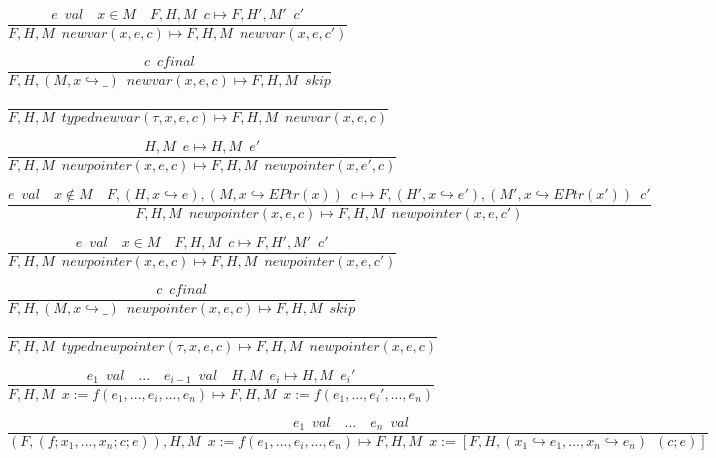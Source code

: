 \documentclass{article}
\begin{document}
\centerline{$\dfrac{e \enspace val \quad x \in M \quad F, H, M  \enspace c \longmapsto F, H', M' \enspace c'}{F, H, M \enspace newvar(x, e, c) \longmapsto F, H, M \enspace newvar(x, e, c')  }$}\vspace{5pt}

\centerline{$\dfrac{c \enspace cfinal}{F, H, (M, x \hookrightarrow \_) \enspace newvar(x, e, c) \longmapsto F, H, M \enspace skip  }$}\vspace{5pt}

\centerline{$\dfrac{}{F, H, M \enspace typednewvar(\tau,x, e, c) \longmapsto F, H, M \enspace newvar(x, e, c)  }$}\vspace{5pt}

\centerline{$\dfrac{H, M \enspace e \longmapsto H, M \enspace e'}{F, H, M \enspace newpointer(x, e, c) \longmapsto F, H, M \enspace newpointer(x, e', c)  }$}\vspace{5pt}

\centerline{$\dfrac{e \enspace val \quad x \notin M \quad F, (H, x \hookrightarrow e), (M, x \hookrightarrow EPtr(x))  \enspace c \longmapsto F, (H', x \hookrightarrow e'), (M', x \hookrightarrow EPtr(x')) \enspace c'}{F, H, M \enspace newpointer(x, e, c) \longmapsto F, H, M \enspace newpointer(x, e, c')  }$}\vspace{5pt}

\centerline{$\dfrac{e \enspace val \quad x \in M \quad F, H, M  \enspace c \longmapsto F, H', M' \enspace c'}{F, H, M \enspace newpointer(x, e, c) \longmapsto F, H, M \enspace newpointer(x, e, c')  }$}\vspace{5pt}

\centerline{$\dfrac{c \enspace cfinal}{F, H, (M, x \hookrightarrow \_) \enspace newpointer(x, e, c) \longmapsto F, H, M \enspace skip  }$}\vspace{5pt}

\centerline{$\dfrac{}{F, H, M \enspace typednewpointer(\tau,x, e, c) \longmapsto F, H, M \enspace newpointer(x, e, c)  }$}\vspace{5pt}

\centerline{$\dfrac{e_1 \enspace val \quad ... \quad e_{i-1} \enspace val \quad H, M \enspace e_i \longmapsto H, M \enspace e_i' }{F, H, M \enspace x:= f(e_1, ..., e_i, ..., e_n) \longmapsto F, H, M \enspace x:= f(e_1, ..., e_i', ..., e_n)}$}  \vspace{5pt}

\centerline{$\dfrac{e_1 \enspace val \quad ... \quad e_n \enspace val \quad  }{(F, (f; x_1, ..., x_n; c; e)), H, M \enspace x:= f(e_1, ..., e_i, ..., e_n) \longmapsto F, H, M \enspace x:= [F, H, (x_1 \hookrightarrow e_1, ...,  x_n \hookrightarrow e_n) \enspace (c;e)]}$}  \vspace{5pt}
\end{document}

